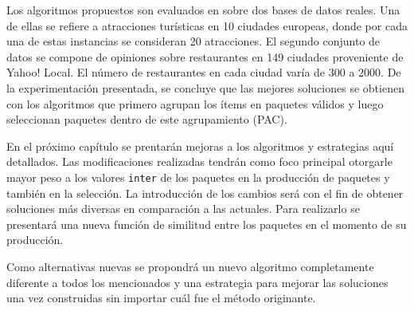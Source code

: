 Los algoritmos propuestos son evaluados en \cite{compositeRetrival} sobre dos bases de datos reales. Una de ellas se refiere a atracciones turísticas en 10 ciudades europeas, donde por cada una de estas instancias se consideran 20 atracciones. El segundo conjunto de datos se compone de opiniones sobre restaurantes en 149 ciudades proveniente de Yahoo! Local. El número de restaurantes en cada ciudad varía de 300 a 2000. De la experimentación presentada, se concluye que las mejores soluciones se obtienen con los algoritmos que primero agrupan los ítems en paquetes válidos y luego seleccionan paquetes dentro de este agrupamiento (PAC).

En el próximo capítulo se prentarán mejoras a los algoritmos y estrategias aquí detallados. Las modificaciones realizadas tendrán como foco principal otorgarle mayor peso a los valores \texttt{inter} de los paquetes en la producción de paquetes y también en la selección. La introducción de los cambios será con el fin de obtener soluciones más diversas en comparación a las actuales. Para realizarlo se presentará una nueva función de similitud entre los paquetes en el momento de su producción. 

Como alternativas nuevas se propondrá un nuevo algoritmo completamente diferente a todos los mencionados y una estrategia para mejorar las soluciones una vez construidas sin importar cuál fue el método originante.
